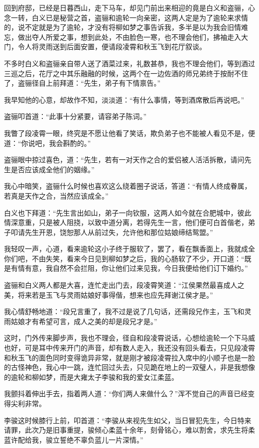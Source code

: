 回到府邸，已经是日暮西山，走下马车，却见门前出来相迎的竟是白义和盗骊，心念一转，白义已是秘营之首，盗骊和逾轮一向亲密，这两人定是为了逾轮来求情的，说不定就是为了逾轮，才没有将柳如梦之事告诉我，多半是以为我会旧情难忘，做出夺人所爱之事，想到此处，不由脸色一寒，也不理会他们，拂袖走入大门，令人将灵雨送到后面安置，便请段凌霄和秋玉飞到花厅叙谈。

不多时白义和盗骊亲自带人送了酒菜过来，礼数甚恭，我也不理会他们，等到酒过三巡之后，花厅之中其乐融融的时候，这两个在一边佐酒的师兄弟终于按耐不住了，盗骊径自上前拜道：“先生，弟子有下情禀告。”

我早知他的心意，却故作不知，淡淡道：“有什么事情，等到酒席散后再说吧。”

盗骊叩首道：“此事十分紧要，请容弟子陈词。”

我瞥了段凌霄一眼，终究是不愿让他看了笑话，欺负弟子也不能被人看见不是，便道：“你说吧，我会斟酌的。”

盗骊眼中掠过喜色，道：“先生，若有一对天作之合的爱侣被人活活拆散，请问先生是否应该成全他们的姻缘。”

我心中暗笑，盗骊什么时候也喜欢这么绕着圈子说话，答道：“有情人终成眷属，若真是天作之合，当然应该成全。”

白义也下拜道：“先生言出如山，弟子一向钦服，这两人如今就在合肥城中，彼此情深意重，只是被人阻挠，以致中道分离，若得先生一言，他们便可白首偕老，弟子叩请先生开恩，饶恕那人从前过失，允许他和那位姑娘缔结鸳盟。”

我轻叹一声，心道，看来逾轮这小子终于服软了，罢了，看在飘香面上，我就成全你们吧，不由失笑，看来今日见到柳如梦之后，我的心肠软了不少，开口道：“既是有情有意，我自然不会拦阻，你让他们过来见我，今日我便给他们订下婚约。”

盗骊和白义两人都是大喜，连忙走出门去，段凌霄笑道：“江侯果然最喜成人之美，将来若是玉飞与灵雨姑娘好事得偕，想来也应先拜谢江侯才是。”

我心情舒畅地道：“段兄言重了，我不过是说了几句话，还需段兄作主，玉飞和灵雨姑娘才有希望可言，成人之美的却是段兄才是。”

这时，门外传来脚步声，我也不理会，径自和段凌霄说话，心想给逾轮一个下马威也好，可是耳中传来开门的声音，却有数人走入，我还没有回头看去，只见段凌霄和秋玉飞的面色同时变得诡异非常，就是刚才被段凌霄拉入席中的小顺子也是一脸的古怪神色，我心中一跳，连忙回过头去，只见跪在地上的一双璧人，非是我想像的逾轮和柳如梦，而是大雍太子李骏和我的爱女江柔蓝。

我颤抖着伸出手去，指着两人道：“你们两人来做什么？”浑不觉自己的声音已经变得尖利非常。

李骏这时候膝行上前，叩首道：“李骏从来视先生如父，当日冒犯先生，今日特来请罪，此次乃是旧事重提，骏倾心柔蓝十余年，刻骨铭心，难以割舍，求先生将柔蓝许配给我，骏立誓绝不辜负蓝儿一片深情。”

